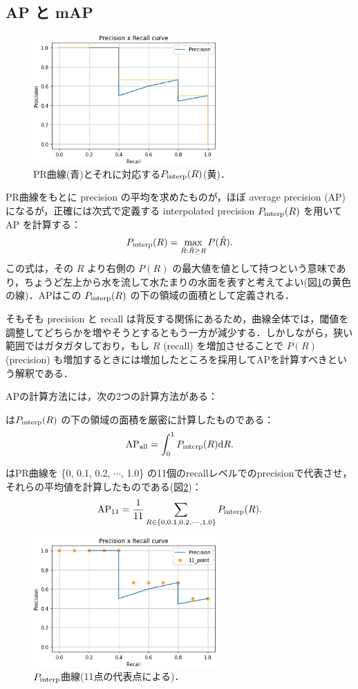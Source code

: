\documentclass[twocolumn]{jsarticle} %
\begin{document}
\subsection{AP と mAP}
\begin{figure}
    \centering
    \includegraphics[width=7cm,clip]{fig/PR_interp.eps}
    \caption{ PR曲線(青)とそれに対応する$P_{\rm interp}(R)$(黄)．}
    \label{fig:PRinterp}
\end{figure}
PR曲線をもとに precision の平均を求めたものが，ほぼ average precision (AP) になるが，正確には次式で定義する  interpolated precision $P_{\rm interp}(R)$ を用いて AP を計算する：
$$ P_{\rm interp}(R) = \max_{\tilde{R}:\tilde{R}{\geq}R} P(\tilde{R}). $$
この式は，その $R$ より右側の $P(R)$ の最大値を値として持つという意味であり，ちょうど左上から水を流して水たまりの水面を表すと考えてよい(図\ref{fig:PRinterp}の黄色の線)．APはこの $P_{\rm interp}(R)$ の下の領域の面積として定義される．

そもそも precision と recall は背反する関係にあるため，曲線全体では，閾値を調整してどちらかを増やそうとするともう一方が減少する．しかしながら，狭い範囲ではガタガタしており，もし $R$ (recall) を増加させることで $P(R)$ (precision) も増加するときには増加したところを採用してAPを計算すべきという解釈である\cite{MRS09}．

APの計算方法には，次の2つの計算方法がある：

は$P_{\rm interp}(R)$ の下の領域の面積を厳密に計算したものである：
$$ \mbox{AP}_{\rm all} = \int_0^1 P_{\rm interp}(R) {\rm d}R. $$

はPR曲線を \{0, 0.1, 0.2, $\cdots$, 1.0\} の11個のrecallレベルでのprecisionで代表させ，それらの平均値を計算したものである(図\ref{fig:PR11})：
$$ \mbox{AP}_{11} = \frac{1}{11} \sum_{R\in\{0, 0.1, 0.2, \cdots, 1.0\}} P_{\rm interp}(R). $$
\begin{figure}
    \centering
    \includegraphics[width=7cm,clip]{fig/PR_11.eps}
    \caption{ $P_{\rm interp}$曲線(11点の代表点による)．}
    \label{fig:PR11}
\end{figure}
\end{document}
